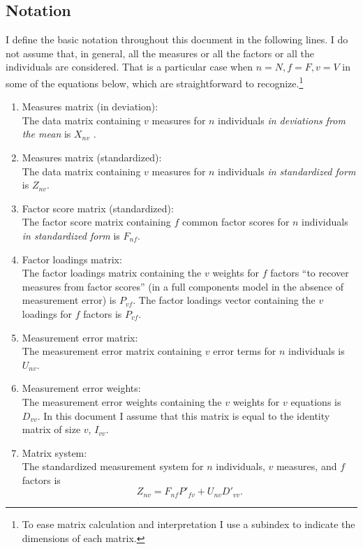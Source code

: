 \subsection{Notation}
I define the basic notation throughout this document in the following lines. I do not assume that, in general, all the measures or all the factors or all the individuals are considered. That is a particular case when $n= N, f=F, v=V$ in some of the equations below, which are straightforward to recognize.\footnote{To ease matrix calculation and interpretation I use a subindex to indicate the dimensions of each matrix.}
\begin{enumerate}
\item Measures matrix (in deviation): \\
\noindent The data matrix containing $v$ measures for $n$ individuals \textit{in deviations from the mean} is $X_{nv}$ .
\item Measures matrix (standardized): \\
\noindent The data matrix containing $v$ measures for $n$ individuals \textit{in standardized form} is $Z_{nv}$.
\item Factor score matrix (standardized): \\
\noindent The factor score matrix containing $f$ common factor scores for $n$ individuals \textit{in standardized form} is $F_{nf}$.
\item Factor loadings matrix:\\
\noindent The factor loadings matrix containing the $v$ weights for $f$ factors ``to recover measures from factor scores'' (in a full components model in the absence of measurement error) is $P_{vf}$.
\noindent The factor loadings vector containing the $v$ loadings for $f$ factors is $P_{vf}$.  
\item Measurement error matrix:\\
\noindent The measurement error matrix containing $v$ error terms for $n$ individuals is $U_{nv}$.
\item Measurement error weights:\\
\noindent The measurement error weights containing the $v$ weights for $v$ equations is $D_{vv}$. In this document I assume that this matrix is equal to the identity matrix of size $v$, $I_{vv}$.
\item Matrix system:\\
\noindent The standardized measurement system for $n$ individuals, $v$ measures, and $f$ factors is
\begin{equation}
Z_{nv} = F_{nf} P'_{fv} + U_{nv} D'_{vv}.

\end{equation}
\end{enumerate}
